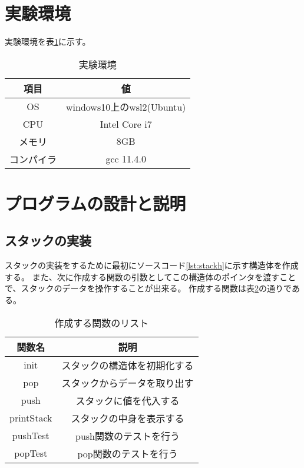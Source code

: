 \documentclass[dvipdfmx]{jsarticle}
\begin{document}
\section{実験環境}
実験環境を表\ref{tab:environment}に示す。
\begin{table}[ht]
  \centering
  \begin{tabular}{|c|c|}
    \hline
    \textbf{項目} & \textbf{値}              \\
    \hline
    OS          & windows10上のwsl2(Ubuntu) \\
    \hline
    CPU         & Intel Core i7           \\
    \hline
    メモリ         & 8GB                     \\
    \hline
    コンパイラ       & gcc 11.4.0              \\
    \hline
  \end{tabular}
  \caption{実験環境}
  \label{tab:environment}
\end{table}
\newpage
\section{プログラムの設計と説明}
\subsection{スタックの実装}
スタックの実装をするために最初にソースコード\ref{lst:stackh}に示す構造体を作成する。
また、次に作成する関数の引数としてこの構造体のポインタを渡すことで、スタックのデータを操作することが出来る。
作成する関数は表\ref{tab:functions}の通りである。
\begin{table}[ht]
  \centering
  \begin{tabular}{|c|c|}
    \hline
    \textbf{関数名} & \textbf{説明}    \\
    \hline
    init         & スタックの構造体を初期化する \\
    \hline
    pop          & スタックからデータを取り出す \\
    \hline
    push         & スタックに値を代入する    \\
    \hline
    printStack   & スタックの中身を表示する   \\
    \hline
    pushTest     & push関数のテストを行う  \\
    \hline
    popTest      & pop関数のテストを行う   \\
    \hline
  \end{tabular}
  \caption{作成する関数のリスト}
  \label{tab:functions}
\end{table}
\end{document}
